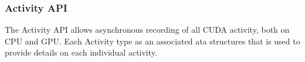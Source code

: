 \subsubsection{Activity API}
\label{sec:cuda:prof:activity}

The Activity API allows asynchronous recording of all CUDA activity, both on CPU and GPU. Each Activity type as an associated ata structures that is used to provide details on each individual activity.